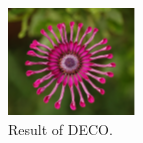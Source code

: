 \documentclass{article}
\begin{document}
\begin{CJK}{UTF8}{gbsn}
\begin{figure} [htb]
	\centering 
	\begin{minipage}[c]{0.3\textwidth} 
		\centering 
		\includegraphics[width=\textwidth]{imgs/flower1.png}
		\caption{Result of DECO.}
	\end{minipage}%
	\begin{minipage}[c]{0.5\textwidth} 
		\centering 
		\hspace{0.01\linewidth}

\end{minipage}
\end{figure}
\end{CJK}
\end{document}
